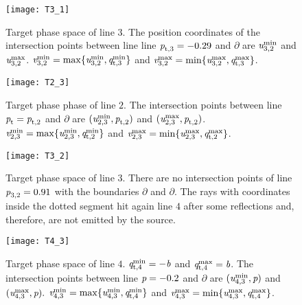  \begin{figure}
\begin{minipage}[]{.48\textwidth}
   \centering
   \texttt{[image: T3\_1]}
   \caption{\footnotesize{Target phase space of line $3$.
  The position coordinates of the intersection points between line line $ \textit{p}_{\textrm{t,} \textit{$3$}} = -0.29$ and
  $\partial$ are $\textit{u}_{3,2}^{\textrm{min}}$ and $\textit{u}_{3,2}^{\textrm{max}}$.
   $\textit{v}_{3,2 }^{\textrm{min}} = \max\{\textit{u}_{3,2}^{\textrm{min}}, \textit{q}_{\textrm{t,} \textit{$3$}}^{\textrm{min}}\}$ and
   $\textit{v}_{3,2 }^{\textrm{max}} = \min\{\textit{u}_{3,2}^{\textrm{max}}, \textit{q}_{\textrm{t,} \textit{$3$}}^{\textrm{max}}\}$.\\}}
   \label{fig:T31}
 \end{minipage}
 \begin{minipage}[]{.48\textwidth}
  \centering
   \texttt{[image: T2\_3]}
\caption{\footnotesize{Target phase phase of line $2$.
 The intersection points between line $\textit{p}_{\textrm{t} \textit{}} = \textit{p}_{\textrm{t,} \textit{$2$}}$ and $\partial$ are
 $(\textit{u}_{2,3}^{\textrm{min}}, \textit{p}_{\textrm{t,} \textit{$2$}})$ and $(\textit{u}_{2,3}^{\textrm{max}}, \textit{p}_{\textrm{t,} \textit{$2$}})$.
 $\textit{v}_{2,3 }^{\textrm{min}} = \max\{\textit{u}_{2,3}^{\textrm{min}}, \textit{q}_{\textrm{t,} \textit{$2$}}^{\textrm{min}}\}$ and
 $\textit{v}_{2,3 }^{\textrm{max}} = \min\{\textit{u}_{2,3}^{\textrm{max}}, \textit{q}_{\textrm{t,} \textit{$2$}}^{\textrm{max}}\}$.\\}}
    \label{fig:T23}
 \end{minipage}
  \begin{minipage}[]{.48\textwidth}
   \centering
   \texttt{[image: T3\_2]}
   \caption{\footnotesize{Target phase space of line $3$. 
  There are no intersection points of line $\textit{p}_{\textrm{$3$,} \textit{$2$}}=0.91$
 with the boundaries $\partial$ and $\partial$.
  The rays with coordinates inside the dotted segment hit again line $4$ after some reflections and, therefore, are not emitted by the source.}}
    \label{fig:T32}
 \end{minipage}
 \begin{minipage}[]{.48\textwidth}
   \centering
   \texttt{[image: T4\_3]}
   \caption{\footnotesize{Target phase space of line $4$. $\textit{q}_{\textrm{t,} \textit{$4$}}^{\textrm{min}} = -\textit{b}$ and $\textit{q}_{\textrm{t,} \textit{$4$}}^{\textrm{max}}= \textit{b}$.
  The intersection points between line $\textit{p} = -0.2$ and $\partial$ are $(\textit{u}_{4,3}^{\textrm{min}}, \textit{p})$ and $(\textit{u}_{4,3}^{\textrm{max}}, \textit{p}).$ $\textit{v}_{4,3}^{\textrm{min}} = \max\{\textit{u}_{4,3}^{\textrm{min}}, \textit{q}_{\textrm{t,} \textit{$4$}}^{\textrm{min}}\}$
  and $\textit{v}_{4,3}^{\textrm{max}} = \min\{\textit{u}_{4,3}^{\textrm{max}}, \textit{q}_{\textrm{t,} \textit{$4$}}^{\textrm{max}}\}$.}}
   \label{fig:T43}
\end{minipage}
\hspace{3cm}
\end{figure}
